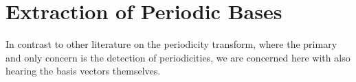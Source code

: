 \section{Extraction of Periodic Bases}\label{section:1:extraction}
In contrast to other literature on the periodicity transform, where the primary and only concern is the detection of periodicities, we are concerned here with also hearing the basis vectors themselves.




%
%
%


